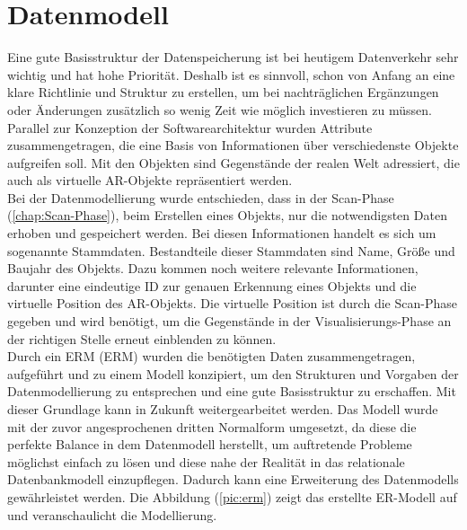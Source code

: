\section{Datenmodell}
\label{chap:Datenmodell}
Eine gute Basisstruktur der Datenspeicherung ist bei heutigem Datenverkehr sehr wichtig und hat hohe Priorität. Deshalb ist 
es sinnvoll, schon von Anfang an eine klare Richtlinie und Struktur zu erstellen, um bei nachträglichen Ergänzungen oder Änderungen zusätzlich so wenig 
Zeit wie möglich investieren zu müssen. Parallel zur Konzeption der Softwarearchitektur wurden Attribute zusammengetragen, die 
eine Basis von Informationen über verschiedenste Objekte aufgreifen soll. Mit den Objekten sind Gegenstände der realen Welt adressiert, die auch als 
virtuelle \acs{AR}-Objekte repräsentiert werden. 
\\
Bei der Datenmodellierung wurde entschieden, dass in der Scan-Phase (\ref{chap:Scan-Phase}), beim Erstellen eines Objekts, nur die notwendigsten 
Daten erhoben und gespeichert werden. Bei diesen Informationen handelt es sich um sogenannte Stammdaten. Bestandteile dieser Stammdaten sind Name, 
Größe und Baujahr des Objekts. Dazu kommen noch weitere relevante Informationen, darunter eine eindeutige ID zur genauen Erkennung eines Objekts und 
die virtuelle Position des \acs{AR}-Objekts. Die virtuelle Position ist durch die Scan-Phase gegeben und wird benötigt, um die Gegenstände in der 
Visualisierungs-Phase an der richtigen Stelle erneut einblenden zu können. 
\\ 
\linebreak 
Durch ein \acl{ERM} (\acs{ERM}) wurden die benötigten Daten zusammengetragen, aufgeführt und zu einem Modell konzipiert, um den Strukturen und 
Vorgaben der Datenmodellierung zu entsprechen und eine gute Basisstruktur zu erschaffen. Mit dieser Grundlage kann in Zukunft weitergearbeitet werden. 
Das Modell wurde mit der zuvor angesprochenen dritten Normalform umgesetzt, da diese die perfekte Balance in dem Datenmodell herstellt, um auftretende 
Probleme möglichst einfach zu lösen und diese nahe der Realität in das relationale Datenbankmodell einzupflegen. Dadurch kann eine Erweiterung des 
Datenmodells gewährleistet werden. Die Abbildung (\ref{pic:erm}) zeigt das erstellte ER-Modell auf und veranschaulicht die Modellierung. 
\\ 
\pagebreak
